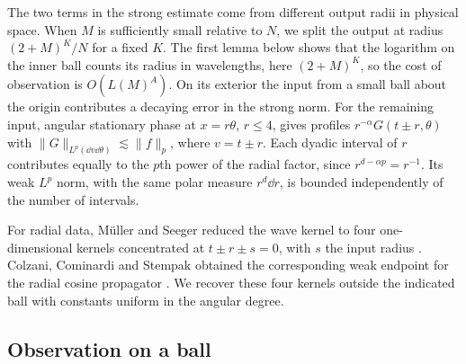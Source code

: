 The two terms in the strong estimate come from different output radii in
physical space. When $M$ is sufficiently small relative to $N$, we split
the output at radius $(2+M)^K/N$ for a fixed $K$. The first lemma below
shows that the logarithm on the inner ball counts its radius in wavelengths,
here $(2+M)^K$, so the cost of observation is $O(L(M)^A)$. On its exterior
the input from a small ball about the origin contributes a decaying error
in the strong norm. For the remaining input, angular stationary phase at
$x=r\theta$, $r\le4$, gives profiles $r^{-\alpha}G(t\pm r,\theta)$ with
$\|G\|_{L^p(\dd v\dd\theta)}\lesssim\|f\|_p$, where $v=t\pm r$. Each
dyadic interval of $r$ contributes equally to the $p$th power of the
radial factor, since $r^{d-\alpha p}=r^{-1}$. Its weak $L^p$ norm, with
the same polar measure $r^d\dd r$, is bounded independently of the
number of intervals.

For radial data, M\"uller and Seeger reduced the wave kernel to four
one-dimensional kernels concentrated at $t\pm r\pm s=0$, with $s$ the
input radius \cite[Lemma~2.1]{MuellerSeeger1995}. Colzani, Cominardi and
Stempak obtained the corresponding weak endpoint for the radial cosine
propagator \cite[Theorem~2.1]{CCS2002}. We recover these four kernels
outside the indicated ball with constants uniform in the angular degree.

\subsection{Observation on a ball}

